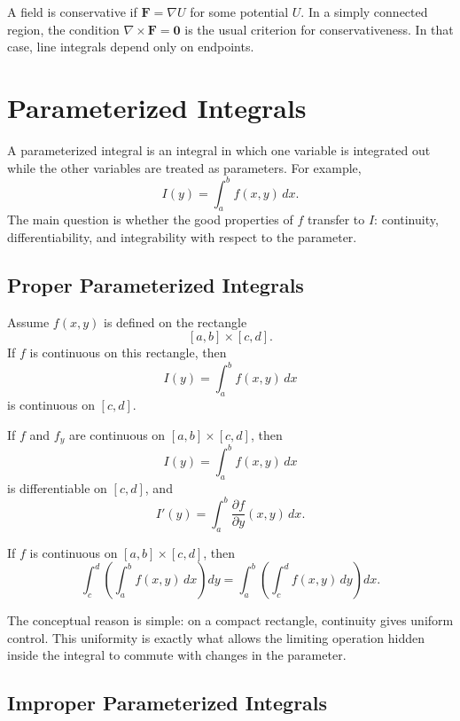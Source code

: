 A field is conservative if $\mathbf F=\nabla U$ for some potential $U$. In a simply connected region, the condition $\nabla\times\mathbf F=\mathbf 0$ is the usual criterion for conservativeness. In that case, line integrals depend only on endpoints.

\section{Parameterized Integrals}

A parameterized integral is an integral in which one variable is integrated out while the other variables are treated as parameters. For example,
\[
    I(y)=\int_a^b f(x,y)\,dx.
\]
The main question is whether the good properties of $f$ transfer to $I$: continuity, differentiability, and integrability with respect to the parameter.

\subsection{Proper Parameterized Integrals}

Assume $f(x,y)$ is defined on the rectangle
\[
    [a,b]\times[c,d].
\]
If $f$ is continuous on this rectangle, then
\[
    I(y)=\int_a^b f(x,y)\,dx
\]
is continuous on $[c,d]$.

\begin{theorem}
If $f$ and $f_y$ are continuous on $[a,b]\times[c,d]$, then
\[
    I(y)=\int_a^b f(x,y)\,dx
\]
is differentiable on $[c,d]$, and
\[
    I'(y)=\int_a^b \frac{\partial f}{\partial y}(x,y)\,dx.
\]
\end{theorem}

\begin{theorem}
If $f$ is continuous on $[a,b]\times[c,d]$, then
\[
    \int_c^d\left(\int_a^b f(x,y)\,dx\right)dy
    =\int_a^b\left(\int_c^d f(x,y)\,dy\right)dx.
\]
\end{theorem}

The conceptual reason is simple: on a compact rectangle, continuity gives uniform control. This uniformity is exactly what allows the limiting operation hidden inside the integral to commute with changes in the parameter.

\subsection{Improper Parameterized Integrals}

